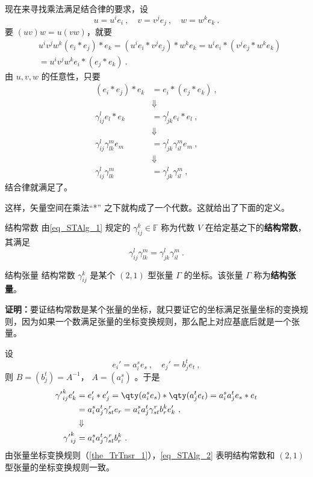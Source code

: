 现在来寻找乘法满足结合律的要求，设
\begin{equation}
u=u^ie_i~,\quad v=v^je_j~,\quad w=w^ke_k~.
\end{equation}
要 $(uv)w=u(vw)$，就要
\begin{equation}
\begin{aligned}
&u^iv^jw^k (e_i*e_j)*e_k=(u^ie_i *v^je_j)*w^ke_k=u^ie_i *(v^je_j*w^ke_k)\\
&=u^iv^jw^k e_i*(e_j*e_k)~.
\end{aligned}
\end{equation}
由 $u,v,w$ 的任意性，只要
\begin{equation}
\begin{aligned}
(e_i*e_j)*e_k&=e_i*(e_j*e_k)~,\\
&\Downarrow\\
\gamma_{ij}^le_l*e_k&=\gamma_{jk}^le_i*e_l~,\\
&\Downarrow\\
\gamma_{ij}^l\gamma_{lk}^{m}e_m&=\gamma_{jk}^l\gamma_{il}^m e_m~,\\
&\Downarrow\\
\gamma_{ij}^l\gamma_{lk}^{m}&=\gamma_{jk}^l\gamma_{il}^m~,
\end{aligned}
\end{equation}
结合律就满足了。

这样，矢量空间在乘法“*” 之下就构成了一个代数。这就给出了下面的定义。
\begin{definition}{结构常数}
由\autoref{eq_STAlg_1} 规定的 $\gamma_{ij}^k\in\mathbb F$ 称为代数 $V$ 在给定基之下的\textbf{结构常数}，其满足
\begin{equation}
\gamma_{ij}^l\gamma_{lk}^{m}=\gamma_{jk}^l\gamma_{il}^m~.
\end{equation}
\end{definition}
\begin{theorem}{结构张量}
结构常数 $\gamma_{ij}^k$ 是某个 $(2,1)$ 型张量 $\Gamma$ 的坐标。该张量 $\Gamma$ 称为\textbf{结构张量}。
\end{theorem}
\textbf{证明：}要证结构常数是某个张量的坐标，就只要证它的坐标满足张量坐标的变换规则，因为如果一个数满足张量的坐标变换规则，那么配上对应基底后就是一个张量。

设
\begin{equation}
e_i'=a_i^s e_s~,\quad e_j'=b_j^t e_t~,
\end{equation}
则 $B=(b_j^t)=A^{-1}$， $A=(a_i^s)$ 。于是
\begin{equation}\label{eq_STAlg_2}
\begin{aligned}
{\gamma'}_{ij}^ke'_k&=e'_i*e'_j=\qty(a_i^s e_s)*\qty(a_j^t e_t)=a_i^s a_j^te_s*e_t\\
&=a_i^sa_j^t\gamma_{st}^r e_r=a_i^sa_j^t\gamma_{st}^r b_r^k e'_k~,\\
&\Downarrow\\
{\gamma'}_{ij}^k&=a_i^sa_j^t\gamma_{st}^r b_r^k~.
\end{aligned}
\end{equation}
由张量坐标变换规则（\autoref{the_TrTnsr_1}），\autoref{eq_STAlg_2} 表明结构常数和 $(2,1)$ 型张量的坐标变换规则一致。

